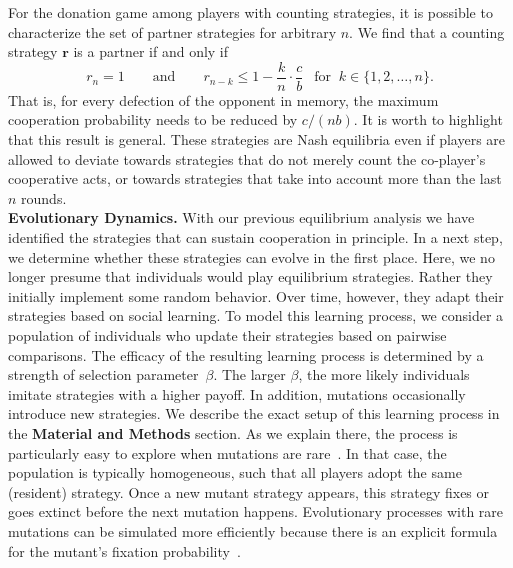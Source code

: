\documentclass[11pt]{article}
\def\methods{\textbf{Material and Methods}}
\begin{document}
For the donation game among players with counting strategies, it is possible to characterize the set of partner strategies for arbitrary $n$. We find that a counting strategy $\mathbf{r}$ is a partner if and only if
\begin{equation} \label{eq:counting}
  r_n = 1 \qquad \text{and} \qquad r_{n - k} \le 1\! -\! \frac{k}{n} \!\cdot\! \frac{c}{b}~~ \text{ for }~k \!\in\! \{1, 2, \dots, n\}.
\end{equation}
That is, for every defection of the opponent in memory, the maximum cooperation probability needs to be reduced by $c/(nb)$.
It is worth to highlight that this result is general. 
These strategies are Nash equilibria even if players are allowed to deviate towards strategies that do not merely count the co-player's cooperative acts, or towards strategies that take into account more than the last $n$ rounds.\\ 



\noindent
\textbf{Evolutionary Dynamics.}
With our previous equilibrium analysis we have identified the strategies that can sustain cooperation in principle. 
In a next step, we determine whether these strategies can evolve in the first place. 
Here, we no longer presume that individuals would play equilibrium strategies. 
Rather they initially implement some random behavior. 
Over time, however, they adapt their strategies based on social learning.
To model this learning process, we consider a population of individuals who update their strategies based on pairwise comparisons. 
The efficacy of the resulting learning process is determined by a strength of selection parameter~$\beta$. 
The larger $\beta$, the more likely individuals imitate strategies with a higher payoff. 
In addition, mutations occasionally introduce new strategies.
We describe the exact setup of this learning process in the \methods{} section.
As we explain there, the process is particularly easy to explore when mutations are rare~\cite{fudenberg:JET:2006,wu:JMB:2012,imhof:royal:2010,mcavoy:jet:2015}. 
In that case, the population is typically homogeneous, such that all players adopt the same (resident) strategy.   
Once a new mutant strategy appears, this strategy fixes or goes extinct before the next mutation happens. 
Evolutionary processes with rare mutations can be simulated more efficiently because there is an explicit formula for the mutant's fixation probability~\citep{nowak:Nature:2004}. 
\end{document}
